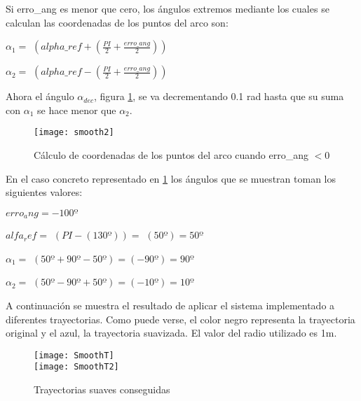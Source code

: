 Si erro\_ang es menor que cero, los ángulos extremos mediante los cuales se calculan las coordenadas de los puntos del arco son:

\begin{center}
$\alpha_{1} =$ $(alpha\_ref + (\frac{PI}{2} + \frac{erro\_ang}{2}))$
\end{center}

\begin{center}
$\alpha_{2} =$ $(alpha\_ref - (\frac{PI}{2} + \frac{erro\_ang}{2}))$
\end{center}

Ahora el ángulo $\alpha_{dec}$, figura \ref{fg:smooth2}, se va decrementando 0.1 rad hasta que su suma con $\alpha_{1}$ se hace menor que $\alpha_{2}$.

\begin{figure}[h]
  \centering\texttt{[image: smooth2]}\\
  \caption{Cálculo de coordenadas de los puntos del arco cuando erro\_ang $< 0$}\label{fg:smooth2}
\end{figure}

En el caso concreto representado en \ref{fg:smooth2} los ángulos que se muestran toman los siguientes valores:
\vspace{0.5cm}

${erro_ang} = -100º$

$alfa_ref =$ $(PI - (130º)) =$ $(50º) = 50º$

$\alpha_{1} =$ $(50º + 90º - 50º) = $$(-90º) = 90º$

$\alpha_{2} =$ $(50º - 90º +50º) = $$(-10º) = 10º$

\vspace{0.5cm}
A continuación se muestra el resultado de aplicar el sistema implementado a diferentes trayectorias. Como puede verse, el color negro representa la trayectoria original y el azul, la trayectoria suavizada. El valor del radio utilizado es 1m.

\begin{figure}[h]
  \centering\texttt{[image: SmoothT]}\\
  \vspace{0.2cm}\texttt{[image: SmoothT2]}\label{fg:smoothT}
  \caption{Trayectorias suaves conseguidas}
\end{figure}

